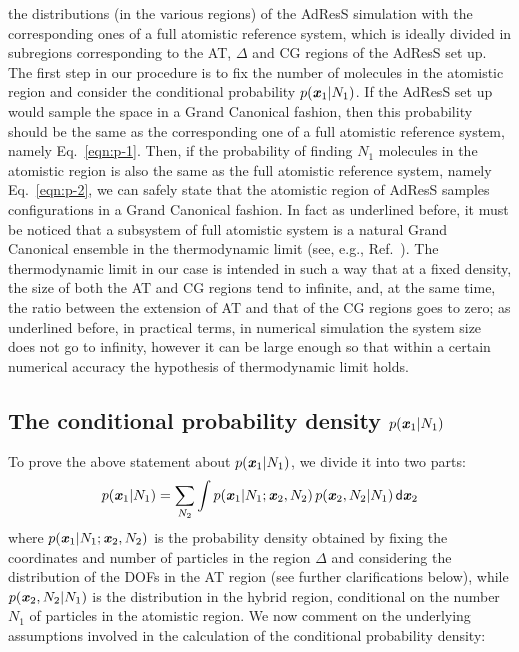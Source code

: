 \documentclass[aip,jcp,a4paper,reprint,onecolumn]{revtex4-1}
\newcommand{\redc}[1]{{\color{red} #1}}
\newcommand{\vect}[1]{\textbf{\textit{#1}}}
\newcommand{\dd}[1]{\textsf{#1}}
\newcommand{\HY}{{\Delta}}
\begin{document}
the distributions (in the various regions) of the AdResS simulation
with the corresponding ones of a full atomistic reference system, which is ideally divided
in subregions corresponding to the AT, $\HY$ and CG regions of the AdResS
set up. The first step in our procedure is to fix the number of molecules in the atomistic
region and consider the conditional probability $p(\vect x_1 |
N_1)$. If the AdResS set up would sample the space in a Grand Canonical fashion, then this
probability should be the same as the corresponding one of a full
atomistic reference system, namely Eq.~\eqref{eqn:p-1}.  Then, if the
probability of finding $N_1$ molecules in the atomistic region is also
the same as the full atomistic reference system, namely
Eq.~\eqref{eqn:p-2}, we can safely state that the atomistic region of AdResS
samples configurations in a Grand Canonical fashion. In fact as underlined before, it must be noticed that a subsystem of full atomistic system is a natural Grand Canonical ensemble in the thermodynamic limit (see, e.g., Ref.~). 
The thermodynamic limit in our case is intended in such a way that at a fixed density, the size of
  both the AT and CG regions tend to infinite, and, at the same time,
  the ratio between the extension of AT and that of the CG regions goes to zero; as underlined before, in practical terms, in numerical simulation the system size does not go to infinity, however it can be large enough so that within a certain numerical accuracy the hypothesis of thermodynamic limit holds.


\subsection{The conditional probability density $p(\vect x_1 | N_1)$}  \label{sec:p-1}

%
To prove the above statement about $p(\vect x_1 | N_1)$, we divide it into two parts:
\begin{align}\label{eqn:divide-cond-p}
  p(\vect x_1 | N_1) = \sum_{N_2}\int
  p(\vect x_1 | N_1; \vect x_2, N_2) \,
  p(\vect x_2, N_2 | N_1)
  \,\dd d\vect x_2
\end{align}
where $p(\vect x_1 | N_1; \vect x_2, N_2)$ is the probability density obtained by fixing the
coordinates and number of particles in the region $\HY$ and considering
the distribution of the DOFs in the AT region \redc{(see further clarifications below)}, while $p(\vect x_2, N_2 | N_1)$ is the distribution in the hybrid region, conditional on the number $N_{1}$ of particles in the atomistic region. We now comment on the underlying assumptions involved in the calculation of the conditional probability density: 
\end{document}
